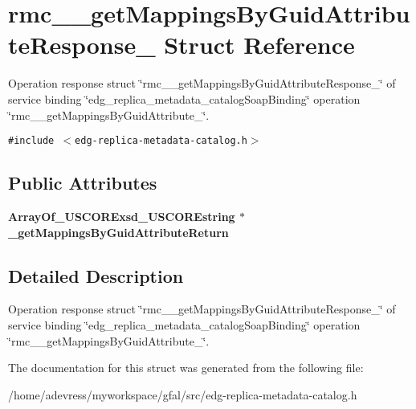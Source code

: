 \section{rmc\_\-\_\-get\-Mappings\-By\-Guid\-Attribute\-Response\_\- Struct Reference}
\label{structrmc____getMappingsByGuidAttributeResponse__}
Operation response struct \char`\"{}rmc\_\-\_\-get\-Mappings\-By\-Guid\-Attribute\-Response\_\-\char`\"{} of service binding \char`\"{}edg\_\-replica\_\-metadata\_\-catalog\-Soap\-Binding\char`\"{} operation \char`\"{}rmc\_\-\_\-get\-Mappings\-By\-Guid\-Attribute\_\-\char`\"{}.  


{\tt \#include $<$edg-replica-metadata-catalog.h$>$}

\subsection*{Public Attributes}
\begin{CompactItemize}
\item 
\bf{Array\-Of\_\-USCORExsd\_\-USCOREstring} $\ast$ \textbf{\_\-get\-Mappings\-By\-Guid\-Attribute\-Return}\label{structrmc____getMappingsByGuidAttributeResponse___e807f487e32572d19a4d9aab25e9e529}

\end{CompactItemize}


\subsection{Detailed Description}
Operation response struct \char`\"{}rmc\_\-\_\-get\-Mappings\-By\-Guid\-Attribute\-Response\_\-\char`\"{} of service binding \char`\"{}edg\_\-replica\_\-metadata\_\-catalog\-Soap\-Binding\char`\"{} operation \char`\"{}rmc\_\-\_\-get\-Mappings\-By\-Guid\-Attribute\_\-\char`\"{}. 



The documentation for this struct was generated from the following file:\begin{CompactItemize}
\item 
/home/adevress/myworkspace/gfal/src/edg-replica-metadata-catalog.h\end{CompactItemize}
